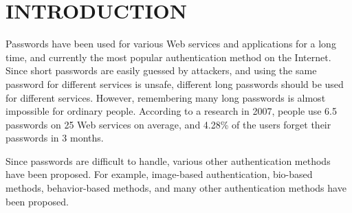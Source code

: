\documentclass{article}
\begin{document}




\section{INTRODUCTION}

% 

Passwords have been used for various Web services and applications
for a long time, and currently the most popular authentication method on the Internet.
%
Since short passwords are easily guessed by attackers, and
using the same password for different services is unsafe,
different long passwords should be used for different services.
However,
remembering many long passwords is almost impossible for ordinary people.
%
According to a research in 2007,
people use 6.5 passwords on 25 Web services on average, and
4.28\% of the users forget their passwords in 3 months\cite{Florencio:2007:LSW:1242572.1242661}.



%   

Since passwords are difficult to handle,
various other authentication methods have been proposed.
For example,
image-based authentication\cite{Biddle:2012:GPL:2333112.2333114}\cite{小池英樹:2006-05-15}\cite{GraphicalPasswords}, 
bio-based methods\cite{},
behavior-based methods\cite{},
and many other authentication methods have been proposed.
\end{document}
